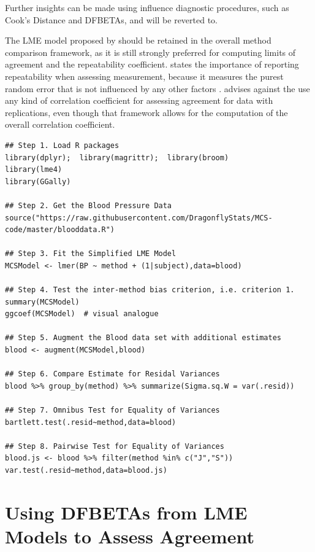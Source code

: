 \documentclass[12pt, a4paper]{report}
\theoremstyle{plain}
\theoremstyle{definition}
\theoremstyle{remark}
\begin{document}
Further insights can be made using influence diagnostic procedures, such as Cook's Distance and DFBETAs, and will be reverted to.


The LME model proposed by \citet{ARoy2009} should be retained in the overall method comparison framework, as it is still strongly preferred for computing limits of agreement and the repeatability coefficient.
\citet{ARoy2009} states the importance of reporting repeatability when assessing measurement, because it measures the purest
random error that is not influenced by any other factors \citep{Barnhart}.
\citet{ARoy2009} advises against the use any kind of correlation coefficient for assessing agreement for data with replications, even though that framework allows for the computation of the overall correlation coefficient.



\newpage

\begin{verbatim}
## Step 1. Load R packages
library(dplyr);  library(magrittr);  library(broom)
library(lme4)
library(GGally)

## Step 2. Get the Blood Pressure Data
source("https://raw.githubusercontent.com/DragonflyStats/MCS-code/master/blooddata.R")

## Step 3. Fit the Simplified LME Model
MCSModel <- lmer(BP ~ method + (1|subject),data=blood)

## Step 4. Test the inter-method bias criterion, i.e. criterion 1.
summary(MCSModel)
ggcoef(MCSModel)  # visual analogue

## Step 5. Augment the Blood data set with additional estimates
blood <- augment(MCSModel,blood)

## Step 6. Compare Estimate for Residal Variances
blood %>% group_by(method) %>% summarize(Sigma.sq.W = var(.resid)) 

## Step 7. Omnibus Test for Equality of Variances
bartlett.test(.resid~method,data=blood)

## Step 8. Pairwise Test for Equality of Variances
blood.js <- blood %>% filter(method %in% c("J","S"))
var.test(.resid~method,data=blood.js)

\end{verbatim}
\section{Using DFBETAs from LME Models to Assess Agreement}
\end{document}
